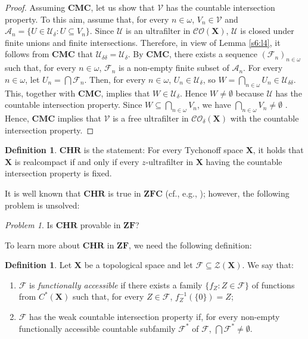 \documentclass[12pt,twoside,leqno]{article}
\theoremstyle{plain}
\theoremstyle{definition}
\newtheorem{definition}[theorem]{Definition}
\theoremstyle{remark}
\newtheorem{problem}[theorem]{Problem}
\begin{document}
\begin{proof}
	Assuming $\mathbf{CMC}$, let us show that $\mathcal{V}$ has the countable intersection property. To this aim, assume that, for every $n\in\omega$, $V_n\in\mathcal{V}$ and $\mathcal{A}_n=\{U\in\mathcal{U}_{\delta}: U\subseteq V_n\}$. Since $\mathcal{U}$ is an ultrafilter in $\mathcal{CO}(\mathbf{X})$, $\mathcal{U}$ is closed under finite unions and finite intersections. Therefore, in view of Lemma \ref{s6:l4}, it follows from $\mathbf{CMC}$ that $\mathcal{U}_{\delta\delta}=\mathcal{U}_{\delta}$.  By $\mathbf{CMC}$, there exists a sequence $(\mathcal{F}_n)_{n\in\omega}$ such that, for every $n\in\omega$, $\mathcal{F}_n$ is a non-empty finite subset of $\mathcal{A}_n$. For every $n\in\omega$, let $U_n=\bigcap \mathcal{F}_n$. Then, for every $n\in\omega$, $U_n\in\mathcal{U}_{\delta}$, so $W=\bigcap\limits_{n\in\omega}U_n\in\mathcal{U}_{\delta\delta}$. This, together with $\mathbf{CMC}$, implies that $W\in\mathcal{U}_{\delta}$. Hence $W\neq\emptyset$ because $\mathcal{U}$ has the countable intersection property.  Since $W\subseteq\bigcap\limits_{n\in\omega}V_n$, we have $\bigcap\limits_{n\in\omega}V_n\neq\emptyset$ . Hence, $\mathbf{CMC}$ implies that $\mathcal{V}$ is a free ultrafilter in $\mathcal{CO}_{\delta}(\mathbf{X})$ with the countable intersection property. 
\end{proof}

\begin{definition} 
	\label{s6:d6}
	$\mathbf{CHR}$ is the statement: For every Tychonoff space $\mathbf{X}$, it holds that $\mathbf{X}$ is realcompact if and only if every $z$-ultrafilter in $\mathbf{X}$ having the countable intersection property is fixed.
\end{definition}

It is well known that $\mathbf{CHR}$ is true in $\mathbf{ZFC}$ (cf., e.g.,  \cite[Theorem 3.11.11]{en}); however, the following problem is unsolved:

\begin{problem}
	\label{s6:q7}
	Is $\mathbf{CHR}$ provable in $\mathbf{ZF}$?
\end{problem}

To learn more about $\mathbf{CHR}$ in $\mathbf{ZF}$, we need the following definition:

\begin{definition} 
	\label{s6:d8}
	Let $\mathbf{X}$ be a topological space and let $\mathcal{F}\subseteq\mathcal{Z}(\mathbf{X})$. We say that:
	\begin{enumerate}
		\item[(i)] $\mathcal{F}$ is \emph{functionally accessible} if there exists a family $\{f_Z: Z\in\mathcal{F}\}$ of functions from $C^{\ast}(\mathbf{X})$ such that, for every $Z\in\mathcal{F}$, $f_Z^{-1}(\{0\})=Z$;
		\item[(ii)]$\mathcal{F}$ has the weak countable intersection property if, for every non-empty functionally accessible countable subfamily $\mathcal{F}^{\ast}$ of $\mathcal{F}$, $\bigcap\mathcal{F}^{\ast}\neq\emptyset$. 
	\end{enumerate}
\end{definition}
\end{document}
